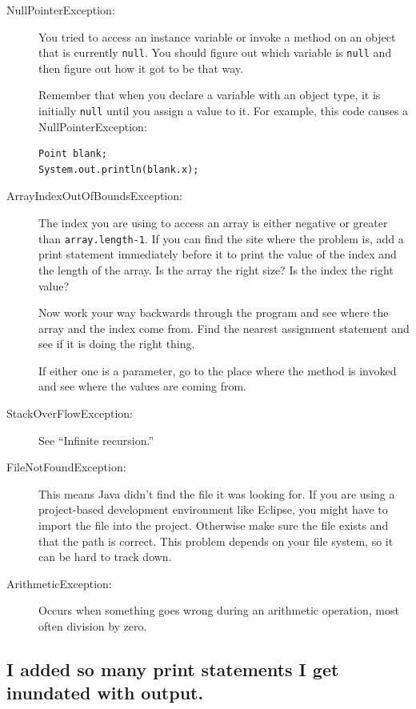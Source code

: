 \documentclass[12pt]{book}
\theoremstyle{exercise}
\begin{document}
\begin{description}

\item[NullPointerException:] You tried to access an instance
variable or invoke a method on an object that is currently
{\tt null}.  You should figure out which variable is {\tt null}
and then figure out how it got to be that way.

Remember that when you declare a variable with an object type,
it is initially {\tt null} until you assign a value to it.
For example, this code causes a NullPointerException:

\begin{lstlisting}
Point blank;
System.out.println(blank.x);
\end{lstlisting}

\item[ArrayIndexOutOfBoundsException:] The index you are using
to access an array is either negative or greater than
{\tt array.length-1}.  If you can find the site where the
problem is, add a print statement immediately before it to
print the value of the index and the length of the array.
Is the array the right size?  Is the index the right value?

Now work your way backwards through the program and see where
the array and the index come from.  Find the nearest assignment
statement and see if it is doing the right thing.

If either one is a parameter, go to the place where the method
is invoked and see where the values are coming from.

\item[StackOverFlowException:] See ``Infinite recursion.''

\item[FileNotFoundException:] This means Java didn't find the file
it was looking for.  If you are using a project-based development
environment like Eclipse, you might have to import the file into
the project.  Otherwise make sure the file exists and that the
path is correct.  This problem depends on your file system, so it
can be hard to track down.

\item[ArithmeticException:] Occurs when something goes wrong during
an arithmetic operation, most often division by zero.

\end{description}


\subsection*{I added so many print statements I get inundated with
output.}
\end{document}
